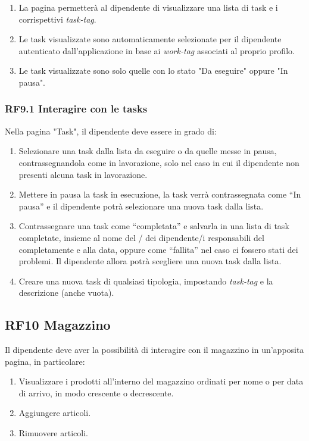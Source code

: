 \documentclass{report}
\begin{document}
\begin{enumerate}
	\item La pagina permetterà al dipendente di visualizzare una lista di task e i corrispettivi \textit{task-tag}.
	
	\item Le task visualizzate sono automaticamente selezionate per il dipendente autenticato dall’applicazione in base ai \textit{work-tag} associati al proprio profilo.
	
	\item Le task visualizzate sono solo quelle con lo stato "Da eseguire" oppure "In pausa".

	
\end{enumerate}

\subsubsection*{RF9.1 Interagire con le tasks}

Nella pagina "Task", il dipendente deve essere in grado di:

\begin{enumerate}
	\item Selezionare una task dalla lista da eseguire o da quelle messe in pausa, contrassegnandola come in lavorazione, solo nel caso in cui il dipendente non presenti alcuna task in lavorazione.
	
	\item Mettere in pausa la task in esecuzione, la task verrà contrassegnata come “In pausa” e il dipendente potrà selezionare una nuova task dalla lista.
	
	\item Contrassegnare una task come “completata” e salvarla in una lista di task completate, insieme al nome del / dei dipendente/i responsabili del completamente e alla data, oppure come “fallita” nel caso ci fossero stati dei problemi. Il dipendente allora potrà scegliere una nuova task dalla lista.
	
	\item Creare una nuova task di qualsiasi tipologia, impostando \textit{task-tag} e la descrizione (anche vuota).
\end{enumerate}

\subsection*{RF10 Magazzino}
Il dipendente deve aver la possibilità di interagire con il magazzino in un'apposita pagina, in particolare:
\begin{enumerate}
	\item Visualizzare i prodotti all'interno del magazzino ordinati per nome o per data di arrivo, in modo crescente o decrescente.
	\item Aggiungere articoli.
	\item Rimuovere articoli.
\end{enumerate}
\end{document}
